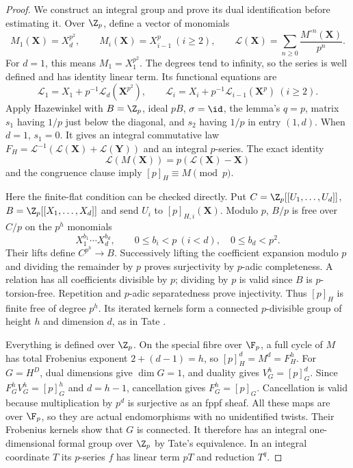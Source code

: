 \begin{proof}
We construct an integral group and prove its dual identification before estimating it. Over $\Z_p$, define a vector of monomials
\[
 M_1(\mathbf X)=X_d^{p^2},\qquad M_i(\mathbf X)=X_{i-1}^p\ (i\ge2),
 \qquad \mathcal L(\mathbf X)=\sum_{n\ge0}\frac{M^{\circ n}(\mathbf X)}{p^n}.
\]
For $d=1$, this means $M_1=X_1^{p^2}$. The degrees tend to infinity, so the series is well defined and has identity linear term. Its functional equations are
\[
 \mathcal L_1=X_1+p^{-1}\mathcal L_d(\mathbf X^{p^2}),\qquad
 \mathcal L_i=X_i+p^{-1}\mathcal L_{i-1}(\mathbf X^p)\ (i\ge2).
\]
Apply Hazewinkel \cite[Lemma 2.3, (2.2)--(2.6), p.~74]{Hazewinkel} with $B=\Z_p$, ideal $pB$, $\sigma=\id$, the lemma's $q=p$, matrix $s_1$ having $1/p$ just below the diagonal, and $s_2$ having $1/p$ in entry $(1,d)$. When $d=1$, $s_1=0$. It gives an integral commutative law $F_H=\mathcal L^{-1}(\mathcal L(\mathbf X)+\mathcal L(\mathbf Y))$ and an integral $p$-series. The exact identity
\[
 \mathcal L(M(\mathbf X))=p(\mathcal L(\mathbf X)-\mathbf X)
\]
and the congruence clause \cite[(2.8), p.~75]{Hazewinkel} imply $[p]_H\equiv M\pmod p$.

Here the finite-flat condition can be checked directly. Put $C=\Z_p[[U_1,\ldots,U_d]]$, $B=\Z_p[[X_1,\ldots,X_d]]$ and send $U_i$ to $[p]_{H,i}(\mathbf X)$. Modulo $p$, $B/p$ is free over $C/p$ on the $p^h$ monomials
\[
 X_1^{b_1}\cdots X_d^{b_d},\qquad
 0\le b_i<p\ (i<d),\quad 0\le b_d<p^2.
\]
Their lifts define $C^{p^h}\to B$. Successively lifting the coefficient expansion modulo $p$ and dividing the remainder by $p$ proves surjectivity by $p$-adic completeness. A relation has all coefficients divisible by $p$; dividing by $p$ is valid since $B$ is $p$-torsion-free. Repetition and $p$-adic separatedness prove injectivity. Thus $[p]_H$ is finite free of degree $p^h$. Its iterated kernels form a connected $p$-divisible group of height $h$ and dimension $d$, as in Tate \cite[\S2.2, Proposition 1, pp.~162--164]{Tate67}.

Everything is defined over $\Z_p$. On the special fibre over $\F_p$, a full cycle of $M$ has total Frobenius exponent $2+(d-1)=h$, so $[p]_H^d=M^d=F_H^h$. For $G=H^D$, dual dimensions give $\dim G=1$, and duality gives $V_G^h=[p]_G^d$. Since $F_G^hV_G^h=[p]_G^h$ and $d=h-1$, cancellation gives $F_G^h=[p]_G$. Cancellation is valid because multiplication by $p^d$ is surjective as an fppf sheaf. All these maps are over $\F_p$, so they are actual endomorphisms with no unidentified twists. Their Frobenius kernels show that $G$ is connected. It therefore has an integral one-dimensional formal group over $\Z_p$ by Tate's equivalence. In an integral coordinate $T$ its $p$-series $f$ has linear term $pT$ and reduction $T^q$.


\end{proof}
